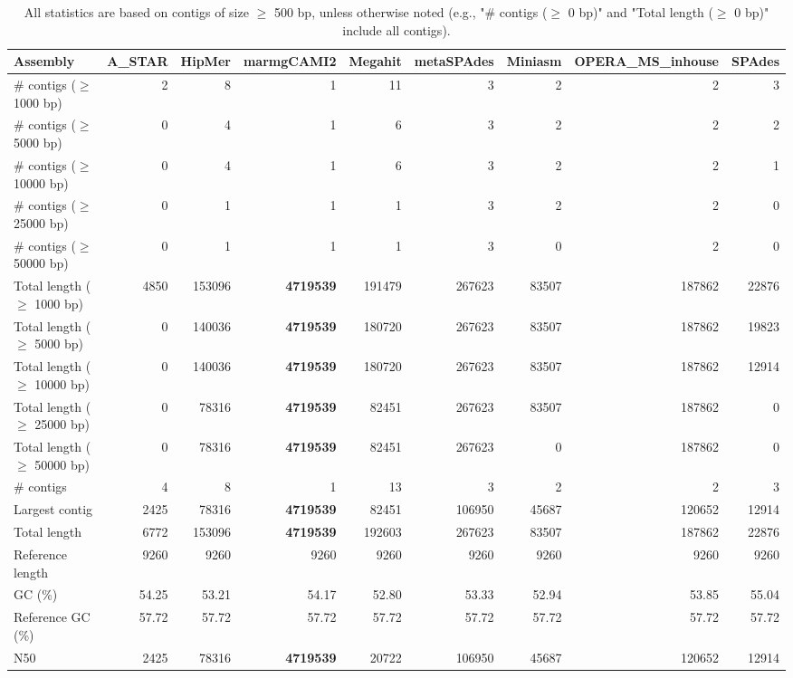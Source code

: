 \documentclass[12pt,a4paper]{article}
\begin{document}
\begin{table}[ht]
\begin{center}
\caption{All statistics are based on contigs of size $\geq$ 500 bp, unless otherwise noted (e.g., "\# contigs ($\geq$ 0 bp)" and "Total length ($\geq$ 0 bp)" include all contigs).}
\begin{tabular}{|l*{8}{|r}|}
\hline
Assembly & A\_STAR & HipMer & marmgCAMI2 & Megahit & metaSPAdes & Miniasm & OPERA\_MS\_inhouse & SPAdes \\ \hline
\# contigs ($\geq$ 1000 bp) & 2 & 8 & 1 & 11 & 3 & 2 & 2 & 3 \\ \hline
\# contigs ($\geq$ 5000 bp) & 0 & 4 & 1 & 6 & 3 & 2 & 2 & 2 \\ \hline
\# contigs ($\geq$ 10000 bp) & 0 & 4 & 1 & 6 & 3 & 2 & 2 & 1 \\ \hline
\# contigs ($\geq$ 25000 bp) & 0 & 1 & 1 & 1 & 3 & 2 & 2 & 0 \\ \hline
\# contigs ($\geq$ 50000 bp) & 0 & 1 & 1 & 1 & 3 & 0 & 2 & 0 \\ \hline
Total length ($\geq$ 1000 bp) & 4850 & 153096 & {\bf 4719539} & 191479 & 267623 & 83507 & 187862 & 22876 \\ \hline
Total length ($\geq$ 5000 bp) & 0 & 140036 & {\bf 4719539} & 180720 & 267623 & 83507 & 187862 & 19823 \\ \hline
Total length ($\geq$ 10000 bp) & 0 & 140036 & {\bf 4719539} & 180720 & 267623 & 83507 & 187862 & 12914 \\ \hline
Total length ($\geq$ 25000 bp) & 0 & 78316 & {\bf 4719539} & 82451 & 267623 & 83507 & 187862 & 0 \\ \hline
Total length ($\geq$ 50000 bp) & 0 & 78316 & {\bf 4719539} & 82451 & 267623 & 0 & 187862 & 0 \\ \hline
\# contigs & 4 & 8 & 1 & 13 & 3 & 2 & 2 & 3 \\ \hline
Largest contig & 2425 & 78316 & {\bf 4719539} & 82451 & 106950 & 45687 & 120652 & 12914 \\ \hline
Total length & 6772 & 153096 & {\bf 4719539} & 192603 & 267623 & 83507 & 187862 & 22876 \\ \hline
Reference length & 9260 & 9260 & 9260 & 9260 & 9260 & 9260 & 9260 & 9260 \\ \hline
GC (\%) & 54.25 & 53.21 & 54.17 & 52.80 & 53.33 & 52.94 & 53.85 & 55.04 \\ \hline
Reference GC (\%) & 57.72 & 57.72 & 57.72 & 57.72 & 57.72 & 57.72 & 57.72 & 57.72 \\ \hline
N50 & 2425 & 78316 & {\bf 4719539} & 20722 & 106950 & 45687 & 120652 & 12914 \\ \hline

\end{tabular}
\end{center}
\end{table}
\end{document}
